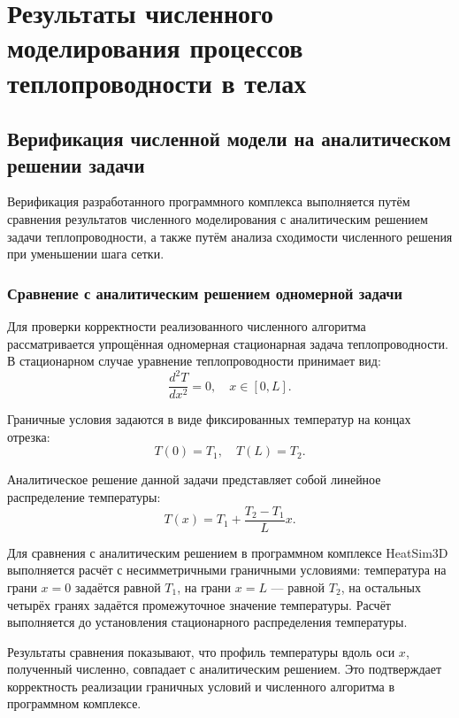 \chapter{Результаты численного моделирования процессов теплопроводности в телах}

\section{Верификация численной модели на аналитическом решении задачи}

Верификация разработанного программного комплекса выполняется путём 
сравнения результатов численного моделирования с аналитическим 
решением задачи теплопроводности, а также путём анализа сходимости 
численного решения при уменьшении шага сетки.

\subsection{Сравнение с аналитическим решением одномерной задачи}

Для проверки корректности реализованного численного алгоритма 
рассматривается упрощённая одномерная стационарная задача 
теплопроводности. В стационарном случае уравнение теплопроводности 
принимает вид:
\begin{equation}
    \frac{d^2 T}{d x^2} = 0, \quad x \in [0, L].
\end{equation}

Граничные условия задаются в виде фиксированных температур на 
концах отрезка:
\begin{equation}
    T(0) = T_1, \quad T(L) = T_2.
\end{equation}

Аналитическое решение данной задачи представляет собой линейное 
распределение температуры:
\begin{equation}
    T(x) = T_1 + \frac{T_2 - T_1}{L} x.
\end{equation}

Для сравнения с аналитическим решением в программном комплексе 
HeatSim3D выполняется расчёт с несимметричными граничными 
условиями: температура на грани $x = 0$ задаётся равной $T_1$, 
на грани $x = L$ --- равной $T_2$, на остальных четырёх гранях 
задаётся промежуточное значение температуры. Расчёт выполняется 
до установления стационарного распределения температуры.

Результаты сравнения показывают, что профиль температуры вдоль 
оси $x$, полученный численно, совпадает с аналитическим решением. 
Это подтверждает корректность реализации граничных условий и 
численного алгоритма в программном комплексе.

